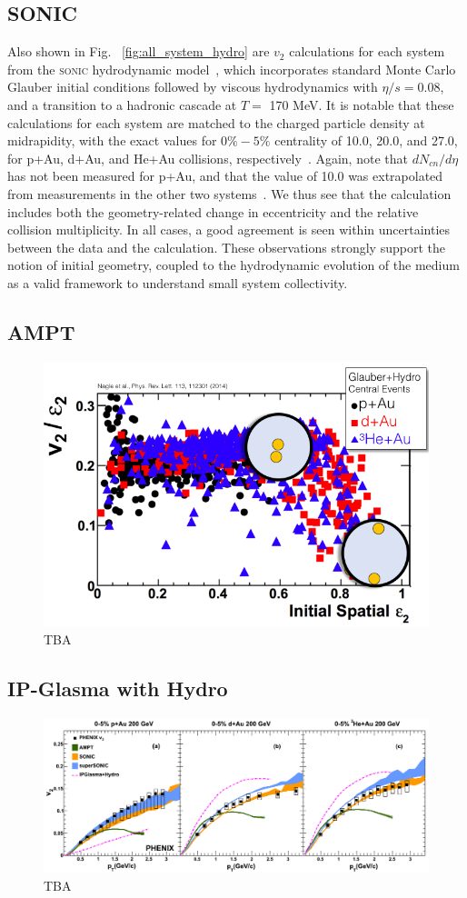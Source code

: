 \subsection{SONIC}
Also shown in Fig. ~\ref{fig:all_system_hydro} are $v_2$ calculations for each system from the \textsc{sonic} hydrodynamic model~\cite{Habich:2014jna}, which incorporates standard Monte Carlo Glauber initial conditions followed by viscous hydrodynamics with $\eta/s=0.08$, and a transition to a  hadronic cascade at $T=$ 170 MeV. It is notable that these calculations for each system are matched to the charged particle density at midrapidity, with the exact values for $0\%-5\%$ centrality of 10.0, 20.0, and 27.0, for p+Au, d+Au, and He+Au collisions, respectively~\cite{Habich:2014jna}. Again, note that $dN_{cn}/d\eta$ has not been measured for p+Au, and that the value of 10.0 was extrapolated from measurements in the other two systems~\cite{Habich:2014jna}. We thus see that the calculation includes both the geometry-related change in eccentricity and the relative collision multiplicity. In all cases, a good agreement is seen within uncertainties between the data and the calculation. These observations strongly support the notion of initial geometry, coupled to the hydrodynamic evolution of the medium as a valid framework to understand small system collectivity.
\subsection{AMPT}
\begin{figure}
\begin{center}
\includegraphics[width=0.6\linewidth]{figs/v2_e2_ampt.png}
\caption{TBA}
\end{center}
\end{figure}
\subsection{IP-Glasma with Hydro}
\begin{figure}
\begin{center}
\includegraphics[width=0.9\linewidth]{figs/indepth_theory_comparison.png}
\caption{TBA}
\end{center}
\end{figure}
